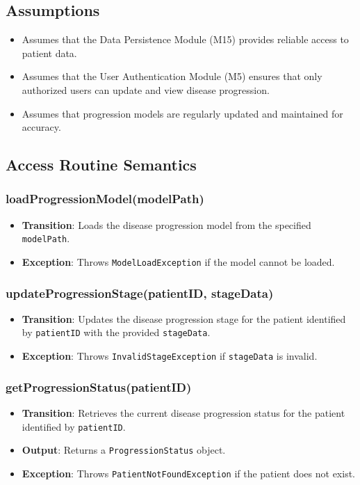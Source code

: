 \documentclass[12pt, titlepage]{article}
\begin{document}
\subsection{Assumptions}
\begin{itemize}
    \item Assumes that the Data Persistence Module (M15) provides reliable access to patient data.
    \item Assumes that the User Authentication Module (M5) ensures that only authorized users can update and view disease progression.
    \item Assumes that progression models are regularly updated and maintained for accuracy.
\end{itemize}

\subsection{Access Routine Semantics}

\subsubsection{loadProgressionModel(modelPath)}
\begin{itemize}
    \item \textbf{Transition}: Loads the disease progression model from the specified \texttt{modelPath}.
    \item \textbf{Exception}: Throws \texttt{ModelLoadException} if the model cannot be loaded.
\end{itemize}

\subsubsection{updateProgressionStage(patientID, stageData)}
\begin{itemize}
    \item \textbf{Transition}: Updates the disease progression stage for the patient identified by \texttt{patientID} with the provided \texttt{stageData}.
    \item \textbf{Exception}: Throws \texttt{InvalidStageException} if \texttt{stageData} is invalid.
\end{itemize}

\subsubsection{getProgressionStatus(patientID)}
\begin{itemize}
    \item \textbf{Transition}: Retrieves the current disease progression status for the patient identified by \texttt{patientID}.
    \item \textbf{Output}: Returns a \texttt{ProgressionStatus} object.
    \item \textbf{Exception}: Throws \texttt{PatientNotFoundException} if the patient does not exist.
\end{itemize}
\end{document}
